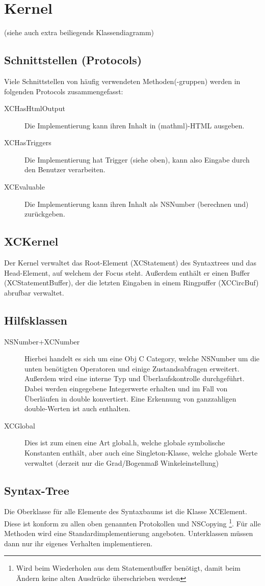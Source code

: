 \section{Kernel}
(siehe auch extra beiliegends Klassendiagramm)
\subsection{Schnittstellen (Protocols)}
Viele Schnittstellen von häufig verwendeten Methoden(-gruppen) werden in folgenden Protocols zusammengefasst:
\begin{description}
	\item[XCHasHtmlOutput] Die Implementierung kann ihren Inhalt in (mathml)-HTML ausgeben. 
	\item[XCHasTriggers] Die Implementierung hat Trigger (siehe oben), kann also Eingabe durch den Benutzer verarbeiten.
	\item[XCEvaluable] Die Implementierung kann ihren Inhalt als NSNumber (berechnen und) zurückgeben.
\end{description}
\subsection{XCKernel}
Der Kernel verwaltet das Root-Element (XCStatement) des Syntaxtrees und das Head-Element, auf welchem der Focus steht. Außerdem enthält er einen Buffer (XCStatementBuffer), der die letzten Eingaben in einem Ringpuffer (XCCircBuf) abrufbar verwaltet.
\subsection{Hilfsklassen}
\begin{description}
	\item[NSNumber+XCNumber] Hierbei handelt es sich um eine Obj C Category, welche NSNumber um die unten benötigten Operatoren und einige Zustandsabfragen erweitert. 
		Außerdem wird eine interne Typ und Überlaufskontrolle durchgeführt. 
		Dabei werden eingegebene Integerwerte erhalten und im Fall von Überläufen in double konvertiert.
	Eine Erkennung von ganzzahligen double-Werten ist auch enthalten.
	\item[XCGlobal] Dies ist zum einen eine Art global.h, welche globale symbolische Konstanten enthält, aber auch eine Singleton-Klasse, welche globale Werte verwaltet (derzeit nur die Grad/Bogenmaß Winkeleinstellung)
\end{description}
\subsection{Syntax-Tree}
Die Oberklasse für alle Elemente des Syntaxbaums ist die Klasse XCElement.
Diese ist konform zu allen oben genannten Protokollen und NSCopying 
\footnote{Wird beim Wiederholen aus dem Statementbuffer benötigt, damit beim Ändern keine alten Ausdrücke überschrieben werden}. 
Für alle Methoden wird eine Standardimplementierung angeboten. 
Unterklassen müssen dann nur ihr eigenes Verhalten implementieren.


